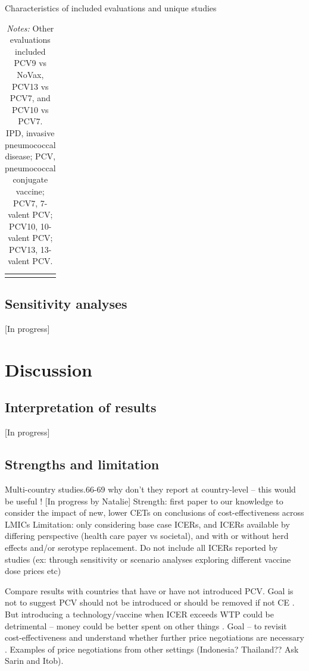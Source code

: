 \documentclass[12pt]{article}
\begin{document}
\begin{table}[H]
    \centering \singlespacing \small
    \caption{Characteristics of included evaluations and unique studies}
    \begin{tabular}{|L{4.5cm}|L{4cm}|C{2.75cm}|C{2.75cm}|}
        \hline
    \end{tabular}
    \label{tab_likely_anyswitch}
    \caption*{\footnotesize \textit{Notes:} Other evaluations included PCV9 vs NoVax, PCV13 vs PCV7, and PCV10 vs PCV7. \\
    IPD, invasive pneumococcal disease; PCV, pneumococcal conjugate vaccine; PCV7, 7-valent PCV; PCV10, 10-valent PCV; PCV13, 13-valent PCV. 
}
\end{table}


\subsection{Sensitivity analyses}
[In progress]


\section{Discussion}
\subsection{Interpretation of results}
[In progress]

\subsection{Strengths and limitation}
Multi-country studies.66-69 why don't they report at country-level – this would be useful !
[In progress by Natalie]
Strength: first paper to our knowledge to consider the impact of new, lower CETs on conclusions of cost-effectiveness across LMICs
Limitation: only considering base case ICERs, and ICERs available by differing perspective (health care payer vs societal), and with or without herd effects and/or serotype replacement.
Do not include all ICERs reported by studies (ex: through sensitivity or scenario analyses exploring different vaccine dose prices etc)

Compare results with countries that have or have not introduced PCV. Goal is not to suggest PCV should not be introduced or should be removed if not CE . But introducing a technology/vaccine when ICER exceeds WTP could be detrimental – money could be better spent on other things .
Goal – to revisit cost-effectiveness and understand whether further price negotiations are necessary . Examples of price negotiations from other settings (Indonesia? Thailand?? Ask Sarin and Itob). 
\end{document}
